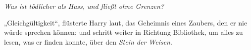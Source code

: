 \emph{Was ist tödlicher als Hass, und fließt ohne Grenzen?}

„Gleichgültigkeit“, flüsterte Harry laut, das Geheimnis eines Zaubers, den er nie würde sprechen können; und schritt weiter in Richtung Bibliothek, um alles zu lesen, was er finden konnte, über den \emph{Stein der Weisen}.

